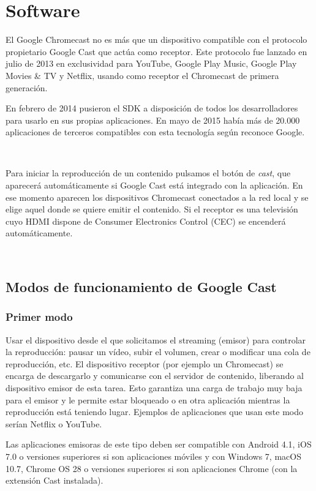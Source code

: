 \section{Software}

El Google Chromecast no es más que un dispositivo compatible con el protocolo propietario Google Cast que actúa como receptor.
Este protocolo fue lanzado en julio de 2013 en exclusividad para YouTube, Google Play Music, Google Play Movies \& TV y Netflix, usando como receptor el Chromecast de primera generación. 

En febrero de 2014 pusieron el SDK a disposición de todos los desarrolladores para usarlo en sus propias aplicaciones.
En mayo de 2015 había más de 20.000 aplicaciones de terceros compatibles con esta tecnología según reconoce Google.

\

Para iniciar la reproducción de un contenido pulsamos el botón de \textit{cast}, que aparecerá automáticamente si Google Cast está integrado con la aplicación.
En ese momento aparecen los dispositivos Chromecast conectados a la red local y se elige aquel donde se quiere emitir el contenido.
Si el receptor es una televisión cuyo HDMI dispone de Consumer Electronics Control (CEC) se encenderá automáticamente.

\

\subsection{Modos de funcionamiento de Google Cast}
\subsubsection{Primer modo}
Usar el dispositivo desde el que solicitamos el streaming (emisor) para controlar la reproducción: pausar un vídeo, subir el volumen, crear o modificar una cola de reproducción, etc.
El dispositivo receptor (por ejemplo un Chromecast) se encarga de descargarlo y comunicarse con el servidor de contenido, liberando al dispositivo emisor de esta tarea.
Esto garantiza una carga de trabajo muy baja para el emisor y le permite estar bloqueado o en otra aplicación mientras la reproducción está teniendo lugar.
Ejemplos de aplicaciones que usan este modo serían Netflix o YouTube.
	
Las aplicaciones emisoras de este tipo deben ser compatible con Android 4.1, iOS 7.0 o versiones superiores si son aplicaciones móviles y con Windows 7, macOS 10.7, Chrome OS 28 o versiones superiores si son aplicaciones Chrome (con la extensión Cast instalada).

